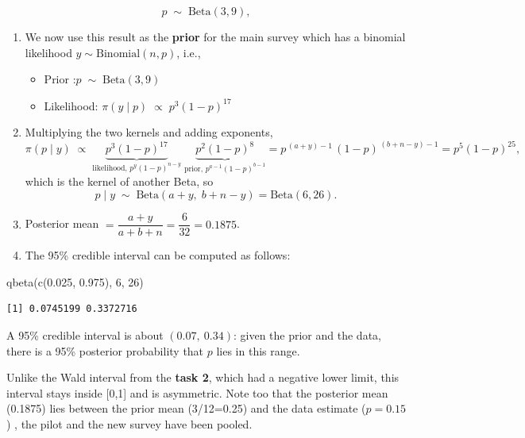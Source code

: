 \documentclass[
  letterpaper,
  DIV=11,
  numbers=noendperiod,
  oneside]{scrartcl}
\newenvironment{Shaded}{\begin{snugshade}}{\end{snugshade}}
\newcommand{\DecValTok}[1]{\textcolor[rgb]{0.68,0.00,0.00}{#1}}
\newcommand{\FloatTok}[1]{\textcolor[rgb]{0.68,0.00,0.00}{#1}}
\newcommand{\FunctionTok}[1]{\textcolor[rgb]{0.28,0.35,0.67}{#1}}
\newcommand{\NormalTok}[1]{\textcolor[rgb]{0.00,0.23,0.31}{#1}}
\providecommand{\tightlist}{%
  \setlength{\itemsep}{0pt}\setlength{\parskip}{0pt}}\usepackage{longtable,booktabs,array}
\begin{document}
\begin{tcolorbox}
\[
p \;\sim\; \text{Beta}(3, 9),
\]

\begin{enumerate}
\def\labelenumi{\arabic{enumi}.}
\setcounter{enumi}{1}
\tightlist
\item
  We now use this result as the \textbf{prior} for the main survey which
  has a binomial likelihood \(y \sim \text{Binomial}(n, p)\), i.e.,

  \begin{itemize}
  \item
    Prior :\(p \;\sim\; \text{Beta}(3, 9)\)
  \item
    Likelihood: \(\pi(y \mid p) \;\propto\; p^{3}(1-p)^{17}\)
  \end{itemize}
\item
  Multiplying the two kernels and adding exponents, \[
  \pi(p \mid y) \;\propto\;
  \underbrace{p^{3}(1-p)^{17}}_{\text{likelihood, } p^{y}(1-p)^{n-y}}\;
  \underbrace{p^{2}(1-p)^{8}}_{\text{prior, } p^{a-1}(1-p)^{b-1}}
  = p^{\,(a+y)-1}\,(1-p)^{\,(b+n-y)-1}
  = p^{5}(1-p)^{25},
  \] which is the kernel of another Beta, so \[
  p \mid y \;\sim\; \text{Beta}(a + y,\; b + n - y) = \text{Beta}(6, 26).
  \]
\item
  Posterior mean \(= \dfrac{a+y}{a+b+n} = \dfrac{6}{32} = 0.1875\).
\item
  The 95\% credible interval can be computed as follows:
\end{enumerate}

\begin{Shaded}
\begin{Highlighting}[]
\FunctionTok{qbeta}\NormalTok{(}\FunctionTok{c}\NormalTok{(}\FloatTok{0.025}\NormalTok{, }\FloatTok{0.975}\NormalTok{), }\DecValTok{6}\NormalTok{, }\DecValTok{26}\NormalTok{)}
\end{Highlighting}
\end{Shaded}

\begin{verbatim}
[1] 0.0745199 0.3372716
\end{verbatim}

A 95\% credible interval is about \((0.07,\ 0.34)\): given the prior and
the data, there is a 95\% posterior probability that \(p\) lies in this
range.

Unlike the Wald interval from the \textbf{task 2}, which had a negative
lower limit, this interval stays inside {[}0,1{]} and is asymmetric.
Note too that the posterior mean (0.1875) lies between the prior mean
(3/12=0.25) and the data estimate (\(\hat p = 0.15\)) , the pilot and
the new survey have been pooled.

\end{tcolorbox}
\end{document}
